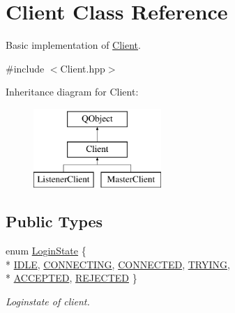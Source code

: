 \hypertarget{class_client}{}\section{Client Class Reference}
\label{class_client}


Basic implementation of \hyperlink{class_client}{Client}.  




{\ttfamily \#include $<$Client.\+hpp$>$}

Inheritance diagram for Client\+:\begin{figure}[H]
\begin{center}
\leavevmode
\includegraphics[height=3.000000cm]{class_client}
\end{center}
\end{figure}
\subsection*{Public Types}
\begin{DoxyCompactItemize}
\item 
enum \hyperlink{class_client_a1ea74a59c03de0d997aab2dc863adf28}{Login\+State} \{ \\*
\hyperlink{class_client_a1ea74a59c03de0d997aab2dc863adf28a36793c560ee4460f256273cb62813d1c}{I\+D\+L\+E}, 
\hyperlink{class_client_a1ea74a59c03de0d997aab2dc863adf28a0c124e4ae12121a08850307bce65375a}{C\+O\+N\+N\+E\+C\+T\+I\+N\+G}, 
\hyperlink{class_client_a1ea74a59c03de0d997aab2dc863adf28a6851b79e5563a2fb2b9e765a45aa7ed4}{C\+O\+N\+N\+E\+C\+T\+E\+D}, 
\hyperlink{class_client_a1ea74a59c03de0d997aab2dc863adf28abdedabe361eb26a7e231aae36ac99c99}{T\+R\+Y\+I\+N\+G}, 
\\*
\hyperlink{class_client_a1ea74a59c03de0d997aab2dc863adf28a1ac90fae2ef3db9ba75effa98fc96cb9}{A\+C\+C\+E\+P\+T\+E\+D}, 
\hyperlink{class_client_a1ea74a59c03de0d997aab2dc863adf28a1ba9041e12f1ebc3ec169a1ba5697bf9}{R\+E\+J\+E\+C\+T\+E\+D}
 \}\begin{DoxyCompactList}\small\item\em Loginstate of client. \end{DoxyCompactList}
\end{DoxyCompactItemize}
